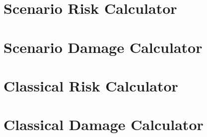 \section{Scenario Risk Calculator}
   \label{sec:acc-sr}
   
\section{Scenario Damage Calculator}
   \label{sec:acc-sd}
   
\section{Classical Risk Calculator}
   \label{sec:acc-cr}
   
\section{Classical Damage Calculator}
   \label{sec:acc-cd}
   
%    
